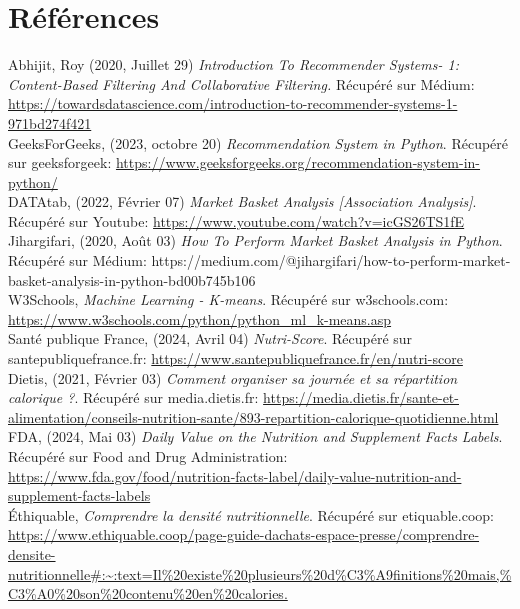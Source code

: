 \documentclass[11pt]{article}
\begin{document}
\newpage
\section{Références}

Abhijit, Roy (2020, Juillet 29) \textit{Introduction To Recommender Systems- 1: Content-Based Filtering And Collaborative Filtering.} Récupéré sur Médium: \url{https://towardsdatascience.com/introduction-to-recommender-systems-1-971bd274f421}\\

GeeksForGeeks, (2023, octobre 20) \textit{Recommendation System in Python}. Récupéré sur geeksforgeek: \url{https://www.geeksforgeeks.org/recommendation-system-in-python/}\\

DATAtab, (2022, Février 07) \textit{Market Basket Analysis [Association Analysis]}. Récupéré sur Youtube: \url{https://www.youtube.com/watch?v=icGS26TS1fE}\\

Jihargifari, (2020, Août 03) \textit{How To Perform Market Basket Analysis in Python}. Récupéré sur Médium: https://medium.com/@jihargifari/how-to-perform-market-basket-analysis-in-python-bd00b745b106 \\

W3Schools, \textit{Machine Learning - K-means}. Récupéré sur w3schools.com: \url{https://www.w3schools.com/python/python_ml_k-means.asp}\\

Santé publique France, (2024, Avril 04) \textit{Nutri-Score}. Récupéré sur santepubliquefrance.fr: \url{https://www.santepubliquefrance.fr/en/nutri-score}\\

Dietis, (2021, Février 03) \textit{Comment organiser sa journée et sa répartition calorique ?}. Récupéré sur media.dietis.fr: \url{https://media.dietis.fr/sante-et-alimentation/conseils-nutrition-sante/893-repartition-calorique-quotidienne.html}\\

FDA, (2024, Mai 03) \textit{Daily Value on the Nutrition and Supplement Facts Labels}. Récupéré sur Food and Drug Administration: \url{https://www.fda.gov/food/nutrition-facts-label/daily-value-nutrition-and-supplement-facts-labels}\\

Éthiquable, \textit{Comprendre la densité nutritionnelle}. Récupéré sur etiquable.coop: \url{https://www.ethiquable.coop/page-guide-dachats-espace-presse/comprendre-densite-nutritionnelle#:~:text=Il\%20existe\%20plusieurs\%20d\%C3\%A9finitions\%20mais,\%C3\%A0\%20son\%20contenu\%20en\%20calories.}\\
\end{document}
